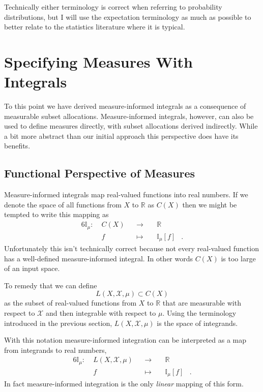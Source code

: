 \documentclass[
  letterpaper,
  DIV=11,
  numbers=noendperiod]{scrartcl}
\begin{document}
Technically either terminology is correct when referring to probability
distributions, but I will use the expectation terminology as much as
possible to better relate to the statistics literature where it is
typical.

\hypertarget{specifying-measures-with-integrals}{%
\section{Specifying Measures With
Integrals}\label{specifying-measures-with-integrals}}

To this point we have derived measure-informed integrals as a
consequence of measurable subset allocations. Measure-informed
integrals, however, can also be used to define measures directly, with
subset allocations derived indirectly. While a bit more abstract than
our initial approach this perspective does have its benefits.

\hypertarget{functional-perspective-of-measures}{%
\subsection{Functional Perspective of
Measures}\label{functional-perspective-of-measures}}

Measure-informed integrals map real-valued functions into real numbers.
If we denote the space of all functions from \(X\) to \(\mathbb{R}\) as
\(C(X)\) then we might be tempted to write this mapping as
\begin{alignat*}{6}
\mathbb{I}_{\mu} :\; & C(X) & &\rightarrow& \; & \mathbb{R} &
\\
& f & &\mapsto& & \mathbb{I}_{\mu}[f] &.
\end{alignat*} Unfortunately this isn't technically correct because not
every real-valued function has a well-defined measure-informed integral.
In other words \(C(X)\) is too large of an input space.

To remedy that we can define \[
L(X, \mathcal{X}, \mu) \subset C(X)
\] as the subset of real-valued functions from \(X\) to \(\mathbb{R}\)
that are measurable with respect to \(\mathcal{X}\) and then integrable
with respect to \(\mu\). Using the terminology introduced in the
previous section, \(L(X, \mathcal{X}, \mu)\) is the space of integrands.

With this notation measure-informed integration can be interpreted as a
map from integrands to real numbers, \begin{alignat*}{6}
\mathbb{I}_{\mu} :\; & L(X, \mathcal{X}, \mu) & &\rightarrow& \;
& \mathbb{R} &
\\
& f & &\mapsto& & \mathbb{I}_{\mu}[f] &.
\end{alignat*} In fact measure-informed integration is the only
\emph{linear} mapping of this form.
\end{document}

